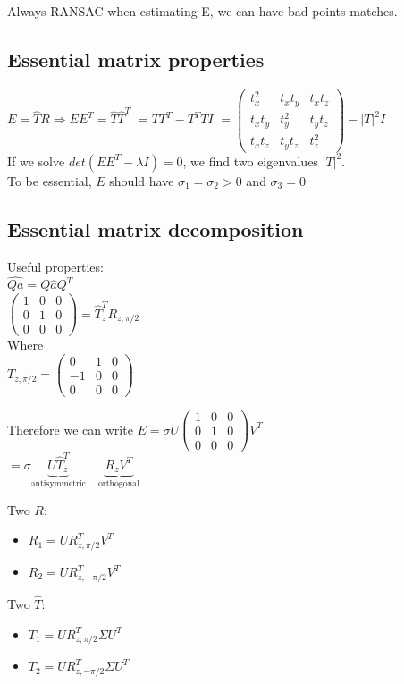 \alert{Always RANSAC when estimating E, we can have bad
points matches.}

\subsection*{Essential matrix properties}
$E = \hat{T} R \Rightarrow E E^T = \hat{T} \hat{T}^T$ 
$=T T^T - T^T T I$
$=\begin{pmatrix} 
  t_x^2 & t_x t_y & t_x t_z \\
  t_x t_y & t_y^2 & t_y t_z \\
  t_x t_z & t_y t_z & t_z^2
\end{pmatrix} - |T|^2 I$\\
If we solve $det(E E^T - \lambda I) = 0$, we find two eigenvalues
$|T|^2$.\\
To be essential, $E$ should have $\sigma_1 = \sigma_2 > 0$ and $\sigma_3
= 0$

\subsection*{Essential matrix decomposition}
Useful properties: \\
$\hat{Q a} = Q \hat{a} Q^T$\\
$\begin{pmatrix}
  1 & 0 & 0 \\ 0 & 1 & 0 \\ 0& 0& 0
\end{pmatrix} =\hat{T}^T_z R_{z, \pi/2}$ \\
Where\\
$T_{z, \pi/2} = \begin{pmatrix} 
  0 & 1 & 0 \\ -1 & 0 & 0\\ 0 & 0 & 0
\end{pmatrix}$

Therefore we can write
$E = \sigma U
\begin{pmatrix}
  1 & 0 & 0 \\ 0 & 1 & 0 \\ 0& 0& 0
\end{pmatrix} V^T$\\
$=\sigma \underbrace{U \hat{T}^T_z}_{\text{antisymmetric}} \quad
\underbrace{R_z V^T}_{\text{orthogonal}}$

Two $R$:
\begin{itemize}
  \item $R_1 = U R^T_{z, \pi/2} V^T$
  \item $R_2 = U R^T_{z, -\pi/2} V^T$
\end{itemize}
Two $\hat{T}$:
\begin{itemize}
  \item $T_1 = U R^T_{z, \pi/2} \Sigma U^T$
  \item $T_2 = U R^T_{z, -\pi/2} \Sigma U^T$
\end{itemize}


